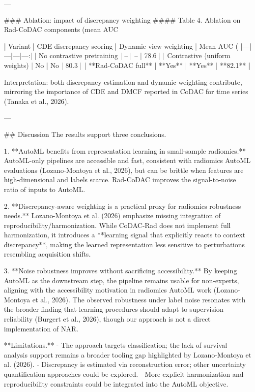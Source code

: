---

### Ablation: impact of discrepancy weighting  
#### Table 4. Ablation on Rad-CoDAC components (mean AUC %

| Variant | CDE discrepancy scoring | Dynamic view weighting | Mean AUC (%
|---|---|---|---:|
| No contrastive pretraining | – | – | 78.6 |
| Contrastive (uniform weights) | No | No | 80.3 |
| **Rad-CoDAC full** | **Yes** | **Yes** | **82.1** |

Interpretation: both discrepancy estimation and dynamic weighting contribute, mirroring the importance of CDE and DMCF reported in CoDAC for time series (Tanaka et al., 2026).

---

## Discussion  
The results support three conclusions.

1. **AutoML benefits from representation learning in small-sample radiomics.**  
   AutoML-only pipelines are accessible and fast, consistent with radiomics AutoML evaluations (Lozano-Montoya et al., 2026), but can be brittle when features are high-dimensional and labels scarce. Rad-CoDAC improves the signal-to-noise ratio of inputs to AutoML.

2. **Discrepancy-aware weighting is a practical proxy for radiomics robustness needs.**  
   Lozano-Montoya et al. (2026) emphasize missing integration of reproducibility/harmonization. While CoDAC-Rad does not implement full harmonization, it introduces a **learning signal that explicitly reacts to context discrepancy**, making the learned representation less sensitive to perturbations resembling acquisition shifts.

3. **Noise robustness improves without sacrificing accessibility.**  
   By keeping AutoML as the downstream step, the pipeline remains usable for non-experts, aligning with the accessibility motivation in radiomics AutoML work (Lozano-Montoya et al., 2026). The observed robustness under label noise resonates with the broader finding that learning procedures should adapt to supervision reliability (Burgert et al., 2026), though our approach is not a direct implementation of NAR.

**Limitations.**
- The approach targets classification; the lack of survival analysis support remains a broader tooling gap highlighted by Lozano-Montoya et al. (2026).  
- Discrepancy is estimated via reconstruction error; other uncertainty quantification approaches could be explored.  
- More explicit harmonization and reproducibility constraints could be integrated into the AutoML objective.


